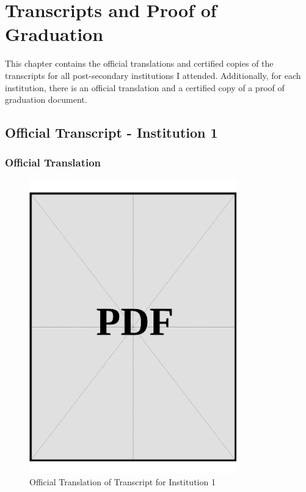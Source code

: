 \chapter{Transcripts and Proof of Graduation}\label{sec:transcripts-and-proof-of-graduation}

This chapter contains the official translations and certified copies of the transcripts for all post-secondary institutions I attended. Additionally, for each institution, there is an official translation and a certified copy of a proof of graduation document.

\clearpage

\section{Official Transcript - Institution 1}\label{sec:institution-1-transcript}

\subsection*{Official Translation}
\vspace*{\fill}

\begin{figure}[h]
    \centering
    \includegraphics[page=1, width=0.8\textwidth]{../application-docs/applicant/post-secondary-institutions/institution-1/transcript/official-translations.pdf}
    \caption{Official Translation of Transcript for Institution 1}
    \label{fig:institution-1-transcript-official-translation}
\end{figure}
\vspace*{\fill}

